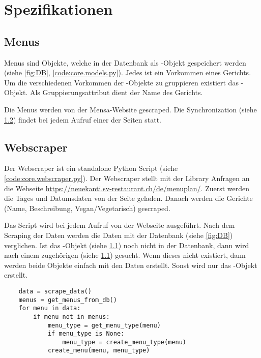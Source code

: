 \chapter{Spezifikationen}

\section{Menus} \label{spez:Menus}

Menus sind Objekte, welche in der Datenbank als -Objekt gespeichert
werden (siehe \ref{fig:DB}, \ref{code:core.models.py}). Jedes  ist
ein Vorkommen eines Gerichts. Um die verschiedenen Vorkommen der
-Objekte zu gruppieren existiert das -Objekt. Als
Gruppierungsattribut dient der Name des Gerichts.

Die Menus werden von der Mensa-Website gescraped. Die Synchronization (siehe
\ref{spez:Webscraper}) findet bei jedem Aufruf einer der Seiten statt.

\section{Webscraper} \label{spez:Webscraper}

Der Webscraper ist ein standalone Python Script (siehe
\ref{code:core.webscraper.py}). Der Webscraper stellt mit der Library
 Anfragen an die Webseite
\url{https://neuekanti.sv-restaurant.ch/de/menuplan/}. Zuerst werden die Tages
und Datumsdaten von der Seite geladen. Danach werden die Gerichte (Name,
Beschreibung, Vegan/Vegetarisch) gescraped.

Das Script wird bei jedem Aufruf von der Webseite ausgeführt. Nach dem Scraping
der Daten werden die Daten mit der Datenbank (siehe \ref{fig:DB}) verglichen.
Ist das -Objekt (siehe \ref{spez:Menus}) noch nicht in der Datenbank,
dann wird nach einem zugehörigen  (siehe \ref{spez:Menus})
gesucht. Wenn dieses nicht existiert, dann werden beide Objekte einfach mit den
Daten erstellt. Sonst wird nur das -Objekt erstellt.

\begin{lstlisting}
    data = scrape_data()
    menus = get_menus_from_db()
    for menu in data:
        if menu not in menus:
            menu_type = get_menu_type(menu)
            if menu_type is None:
                menu_type = create_menu_type(menu)
            create_menu(menu, menu_type)
\end{lstlisting}

